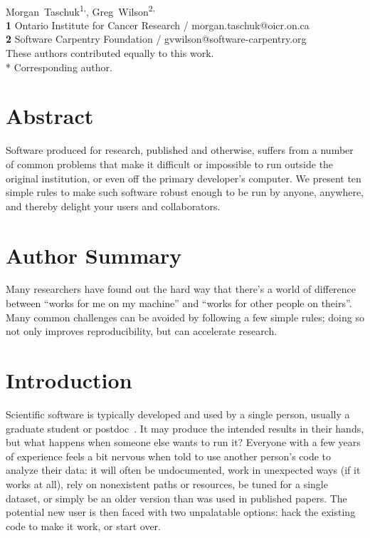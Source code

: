 \documentclass[10pt,letterpaper]{article}
\date{}
\begin{document}
\vspace*{0.2in}

\begin{flushleft}
{\Large
\textbf{}
}
\newline
\\
{Morgan~Taschuk}\textsuperscript{1,\ddag *},
{Greg~Wilson}\textsuperscript{2,\ddag}
\\
\textbf{1} Ontario Institute for Cancer Research / morgan.taschuk@oicr.on.ca
\\
\textbf{2} Software Carpentry Foundation / gvwilson@software-carpentry.org
\\
\bigskip
{\ddag} These authors contributed equally to this work.
\\
* Corresponding author.
\end{flushleft}

\section*{Abstract}

Software produced for research,
published and otherwise,
suffers from a number of common problems
that make it difficult or impossible to run outside the original institution,
or even off the primary developer's computer.
We present ten simple rules to make such software robust enough to be run by anyone,
anywhere,
and thereby delight your users and collaborators.

\section*{Author Summary}

Many researchers have found out the hard way that there's a world of difference
between ``works for me on my machine'' and ``works for other people on theirs''.
Many common challenges can be avoided by following a few simple rules; doing so
not only improves reproducibility, but can accelerate research.

\linenumbers

\section*{Introduction}

Scientific software is typically developed and used by a single person,
usually a graduate student or postdoc~\cite{prins2015}.
It may produce the intended results in their hands,
but what happens when someone else wants to run it? Everyone with
a few years of experience feels a bit nervous when told to use
another person's code to analyze their data:
it will often be undocumented,
work in unexpected ways (if it works at all),
rely on nonexistent paths or resources,
be tuned for a single dataset,
or simply be an older version than was used in published papers.
The potential new user is then faced with two unpalatable options:
hack the existing code to make it work, or start over.
\end{document}

